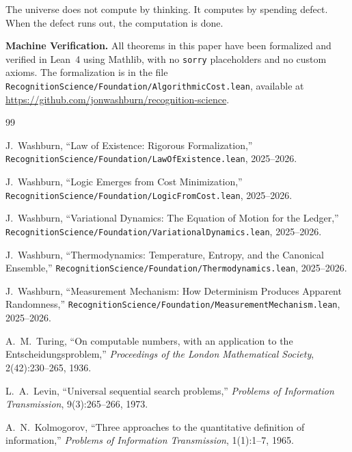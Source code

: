 \documentclass[11pt,a4paper]{article}
\theoremstyle{plain}
\theoremstyle{definition}
\theoremstyle{remark}
\begin{document}
The universe does not compute by thinking.
It computes by spending defect.
When the defect runs out, the computation is done.

\bigskip

\noindent\textbf{Machine Verification.}\quad
All theorems in this paper have been formalized and verified in Lean~4 using Mathlib, with no \texttt{sorry} placeholders and no custom axioms.
The formalization is in the file \texttt{RecognitionScience/Foundation/AlgorithmicCost.lean}, available at \url{https://github.com/jonwashburn/recognition-science}.

\bigskip

\begin{thebibliography}{99}

J.~Washburn, ``Law of Existence: Rigorous Formalization,'' \texttt{RecognitionScience/Foundation/LawOfExistence.lean}, 2025--2026.

J.~Washburn, ``Logic Emerges from Cost Minimization,'' \texttt{RecognitionScience/Foundation/LogicFromCost.lean}, 2025--2026.

J.~Washburn, ``Variational Dynamics: The Equation of Motion for the Ledger,'' \texttt{RecognitionScience/Foundation/VariationalDynamics.lean}, 2025--2026.

J.~Washburn, ``Thermodynamics: Temperature, Entropy, and the Canonical Ensemble,'' \texttt{RecognitionScience/Foundation/Thermodynamics.lean}, 2025--2026.

J.~Washburn, ``Measurement Mechanism: How Determinism Produces Apparent Randomness,'' \texttt{RecognitionScience/Foundation/MeasurementMechanism.lean}, 2025--2026.

A.~M.~Turing, ``On computable numbers, with an application to the Entscheidungsproblem,'' \emph{Proceedings of the London Mathematical Society}, 2(42):230--265, 1936.

L.~A.~Levin, ``Universal sequential search problems,'' \emph{Problems of Information Transmission}, 9(3):265--266, 1973.

A.~N.~Kolmogorov, ``Three approaches to the quantitative definition of information,'' \emph{Problems of Information Transmission}, 1(1):1--7, 1965.

\end{thebibliography}
\end{document}
